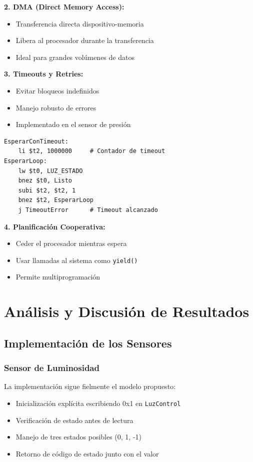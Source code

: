 \documentclass[12pt,a4paper]{article}
\begin{document}
\textbf{2. DMA (Direct Memory Access):}
\begin{itemize}
    \item Transferencia directa dispositivo-memoria
    \item Libera al procesador durante la transferencia
    \item Ideal para grandes volúmenes de datos
\end{itemize}

\textbf{3. Timeouts y Retries:}
\begin{itemize}
    \item Evitar bloqueos indefinidos
    \item Manejo robusto de errores
    \item Implementado en el sensor de presión
\end{itemize}

\begin{lstlisting}[style=mipsstyle]
EsperarConTimeout:
    li $t2, 1000000     # Contador de timeout
EsperarLoop:
    lw $t0, LUZ_ESTADO
    bnez $t0, Listo
    subi $t2, $t2, 1
    bnez $t2, EsperarLoop
    j TimeoutError      # Timeout alcanzado
\end{lstlisting}

\textbf{4. Planificación Cooperativa:}
\begin{itemize}
    \item Ceder el procesador mientras espera
    \item Usar llamadas al sistema como \texttt{yield()}
    \item Permite multiprogramación
\end{itemize}

\section{Análisis y Discusión de Resultados}

\subsection{Implementación de los Sensores}

\subsubsection{Sensor de Luminosidad}
La implementación sigue fielmente el modelo propuesto:
\begin{itemize}
    \item Inicialización explícita escribiendo 0x1 en \texttt{LuzControl}
    \item Verificación de estado antes de lectura
    \item Manejo de tres estados posibles (0, 1, -1)
    \item Retorno de código de estado junto con el valor
\end{itemize}
\end{document}
